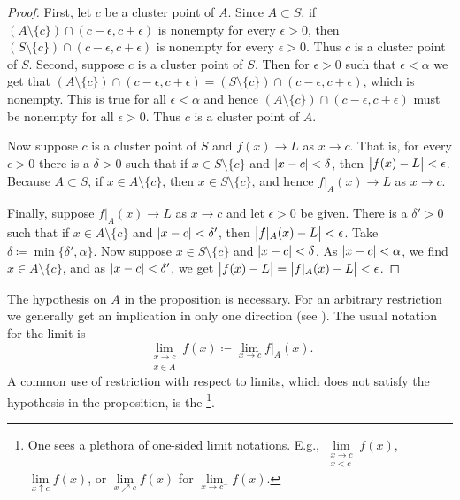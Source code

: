 \begin{proof}
First, let $c$ be a cluster point of $A$.
Since $A \subset S$, if $( A \setminus \{ c\} ) \cap
(c-\epsilon,c+\epsilon)$ is nonempty for every $\epsilon > 0$,
then $( S \setminus \{ c\} ) \cap
(c-\epsilon,c+\epsilon)$ is nonempty for every $\epsilon > 0$.
Thus $c$ is a cluster point of $S$.
Second, suppose $c$ is a cluster
point of $S$.  Then for $\epsilon > 0$ such that $\epsilon < \alpha$
we get that $( A \setminus \{ c\} ) \cap (c-\epsilon,c+\epsilon) =
( S \setminus \{ c\} ) \cap (c-\epsilon,c+\epsilon)$, which is nonempty.  This is true for all
$\epsilon < \alpha$ and hence 
$( A \setminus \{ c\} ) \cap (c-\epsilon,c+\epsilon)$ must be nonempty for all
$\epsilon > 0$.  Thus $c$ is a cluster point of $A$.

Now suppose $c$ is a cluster point of $S$ and $f(x) \to L$ as $x \to c$.  That is, for every $\epsilon > 0$
there is a $\delta > 0$ such that if $x \in S \setminus \{ c \}$
and $\lvert {x-c} \rvert < \delta$, then $\bigl\lvert {f(x)-L} \bigr\rvert < \epsilon$.  Because $A \subset S$,
if $x \in A \setminus \{ c \}$, then $x \in S \setminus \{ c \}$,
and hence $f|_A(x) \to L$ as $x \to c$.

Finally, suppose $f|_A(x) \to L$ as $x \to c$ and let $\epsilon > 0$ be
given.
There is a $\delta' > 0$ such that if $x \in A \setminus \{ c \}$
and $\lvert {x-c} \rvert < \delta'$, then $\bigl\lvert { f|_A(x)-L } \bigr\rvert < \epsilon$.
Take $\delta \coloneqq \min \{ \delta', \alpha \}$.
Now suppose $x \in S \setminus \{ c \}$ and
$\lvert {x-c} \rvert < \delta$.  As $\lvert {x-c} \rvert < \alpha$, we find $x \in A \setminus \{ c \}$,
and as $\lvert {x-c} \rvert < \delta'$, 
we get $\bigl\lvert {f(x)-L} \bigr\rvert = \bigl\lvert { f|_A(x)-L } \bigr\rvert < \epsilon$.
\end{proof}

The hypothesis on $A$ in the proposition is necessary.  For an arbitrary
restriction we generally get an implication in only one direction
(see ).
The usual notation for the limit is
\begin{equation*}
\lim_{\substack{x \to c\\x \in A}} f(x) \coloneqq \lim_{x \to c} f|_A(x) .
\end{equation*}
A common use of restriction with respect to limits, which does not satisfy
the hypothesis in the proposition, is the
\emph{}%
\footnote{%
One sees a plethora of one-sided limit notations.
E.g.,
$\lim\limits_{\substack{x \to c\\x < c}} f(x)$,
$\lim\limits_{x \uparrow c} f(x)$, or
$\lim\limits_{x \nearrow c} f(x)$ for
$\lim\limits_{x \to c^-} f(x)$.}.

